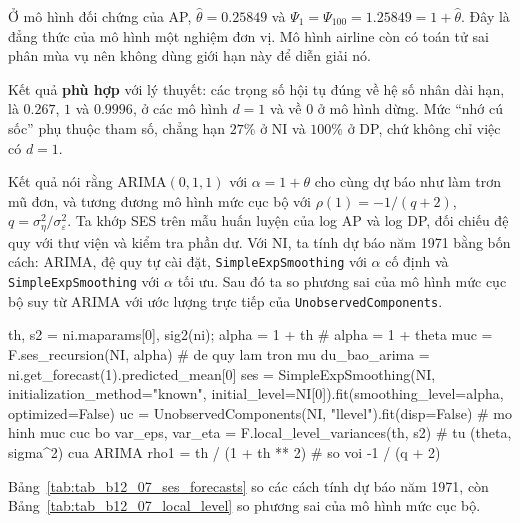 Ở mô hình đối chứng của AP, $\hat\theta=0.25849$ và $\Psi_1=\Psi_{100}=1.25849=1+\hat\theta$. Đây là đẳng thức của mô hình một nghiệm đơn vị. Mô hình airline còn có toán tử sai phân mùa vụ nên không dùng giới hạn này để diễn giải nó.

 Kết quả \textbf{phù hợp} với lý thuyết: các trọng số hội tụ đúng về hệ số nhân dài hạn, là $0.267$, $1$ và $0.9996$, ở các mô hình $d=1$ và về $0$ ở mô hình dừng. Mức ``nhớ cú sốc'' phụ thuộc tham số, chẳng hạn $27\%$ ở NI và $100\%$ ở DP, chứ không chỉ việc có $d=1$.

 Kết quả  nói rằng ARIMA$(0,1,1)$ với $\alpha=1+\theta$ cho cùng dự báo như làm trơn mũ đơn, và tương đương mô hình mức cục bộ với $\rho(1)=-1/(q+2)$, $q=\sigma_\eta^2/\sigma_\varepsilon^2$.
 Ta khớp SES trên mẫu huấn luyện của log AP và log DP, đối chiếu đệ quy với thư viện và kiểm tra phần dư. Với NI, ta tính dự báo năm 1971 bằng bốn cách: ARIMA, đệ quy tự cài đặt, \texttt{SimpleExpSmoothing} với $\alpha$ cố định và \texttt{SimpleExpSmoothing} với $\alpha$ tối ưu. Sau đó ta so phương sai của mô hình mức cục bộ suy từ ARIMA với ước lượng trực tiếp của \texttt{UnobservedComponents}.
\begin{codeblock}
th, s2 = ni.maparams[0], sig2(ni); alpha = 1 + th                # alpha = 1 + theta
muc = F.ses_recursion(NI, alpha)                                 # de quy lam tron mu
du_bao_arima = ni.get_forecast(1).predicted_mean[0]
ses = SimpleExpSmoothing(NI, initialization_method="known",
                         initial_level=NI[0]).fit(smoothing_level=alpha, optimized=False)
uc = UnobservedComponents(NI, "llevel").fit(disp=False)          # mo hinh muc cuc bo
var_eps, var_eta = F.local_level_variances(th, s2)               # tu (theta, sigma^2) cua ARIMA
rho1 = th / (1 + th ** 2)                                        # so voi -1 / (q + 2)
\end{codeblock}
 Bảng~\ref{tab:tab_b12_07_ses_forecasts} so các cách tính dự báo năm 1971, còn Bảng~\ref{tab:tab_b12_07_local_level} so phương sai của mô hình mức cục bộ.
